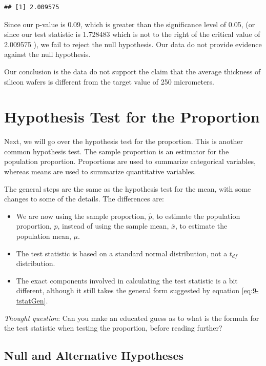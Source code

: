 \documentclass[
]{book}
\begin{document}
\begin{verbatim}
## [1] 2.009575
\end{verbatim}

Since our p-value is 0.09, which is greater than the significance level of 0.05, (or since our test statistic is 1.728483 which is not to the right of the critical value of 2.009575 ), we fail to reject the null hypothesis. Our data do not provide evidence against the null hypothesis.

Our conclusion is the data do not support the claim that the average thickness of silicon wafers is different from the target value of 250 micrometers.

\section{Hypothesis Test for the Proportion}\label{hypothesis-test-for-the-proportion}

Next, we will go over the hypothesis test for the proportion. This is another common hypothesis test. The sample proportion is an estimator for the population proportion. Proportions are used to summarize categorical variables, whereas means are used to summarize quantitative variables.

The general steps are the same as the hypothesis test for the mean, with some changes to some of the details. The differences are:

\begin{itemize}
\item
  We are now using the sample proportion, \(\hat{p}\), to estimate the population proportion, \(p\), instead of using the sample mean, \(\bar{x}\), to estimate the population mean, \(\mu\).
\item
  The test statistic is based on a standard normal distribution, not a \(t_{df}\) distribution.
\item
  The exact components involved in calculating the test statistic is a bit different, although it still takes the general form suggested by equation \eqref{eq:9-tstatGen}.
\end{itemize}

\emph{Thought question}: Can you make an educated guess as to what is the formula for the test statistic when testing the proportion, before reading further?

\subsection{Null and Alternative Hypotheses}\label{null-and-alternative-hypotheses-1}
\end{document}

